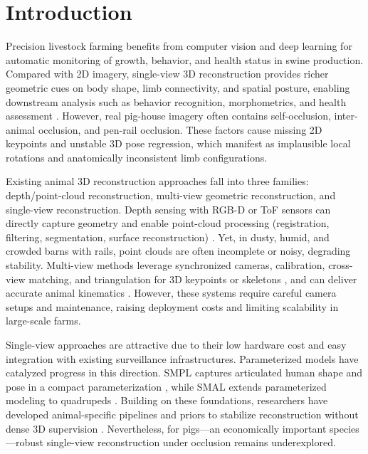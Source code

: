 \documentclass[computers,article,submit,pdftex,moreauthors]{Definitions/mdpi}
\begin{document}
\section{Introduction}\label{sec:intro}

Precision livestock farming benefits from computer vision and deep learning for automatic monitoring of growth, behavior, and health status in swine production. Compared with 2D imagery, single-view 3D reconstruction provides richer geometric cues on body shape, limb connectivity, and spatial posture, enabling downstream analysis such as behavior recognition, morphometrics, and health assessment \cite{ref1,ref2,ref3,ref4,ref5,ref6,ref7,ref8,ref9,ref10}. However, real pig-house imagery often contains self-occlusion, inter-animal occlusion, and pen-rail occlusion. These factors cause missing 2D keypoints and unstable 3D pose regression, which manifest as implausible local rotations and anatomically inconsistent limb configurations.

Existing animal 3D reconstruction approaches fall into three families: depth/point-cloud reconstruction, multi-view geometric reconstruction, and single-view reconstruction. Depth sensing with RGB-D or ToF sensors can directly capture geometry and enable point-cloud processing (registration, filtering, segmentation, surface reconstruction) \cite{ref11,ref12,ref13,ref14}. Yet, in dusty, humid, and crowded barns with rails, point clouds are often incomplete or noisy, degrading stability. Multi-view methods leverage synchronized cameras, calibration, cross-view matching, and triangulation for 3D keypoints or skeletons \cite{ref15,ref16,ref17,ref18}, and can deliver accurate animal kinematics \cite{ref6}. However, these systems require careful camera setups and maintenance, raising deployment costs and limiting scalability in large-scale farms.

Single-view approaches are attractive due to their low hardware cost and easy integration with existing surveillance infrastructures. Parameterized models have catalyzed progress in this direction. SMPL captures articulated human shape and pose in a compact parameterization \cite{ref19}, while SMAL extends parameterized modeling to quadrupeds \cite{ref20,ref21,ref22,ref23,ref24}. Building on these foundations, researchers have developed animal-specific pipelines and priors to stabilize reconstruction without dense 3D supervision \cite{ref25,ref26}. Nevertheless, for pigs---an economically important species---robust single-view reconstruction under occlusion remains underexplored.
\end{document}
